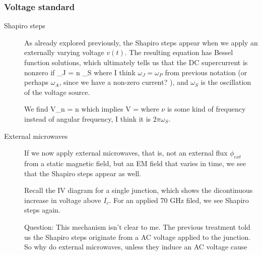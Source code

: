 \subsubsection{Voltage standard}
\begin{description}
\item[Shapiro steps] As already explored previously, the Shapiro steps appear when we apply an externally varying voltage $v(t)$. The resulting equation has Bessel function solutions, which ultimately tells us that the DC supercurrent is nonzero if
\beq
\omega_J = n \omega_S
\eeq
where I think $\omega_J = \omega_P$ from previous notation (or perhaps $\omega_A$, since we have a non-zero current? ), and $\omega_S$ is the oscillation of the voltage source. 

We find
\beq
V_n = n \nu
\eeq
which implies
\beq
\Delta V =  \nu
\eeq
where $\nu$ is some kind of frequency instead of angular frequency, I think it is $2\pi \omega_S$. 

\item[External microwaves] If we now apply external microwaves, that is, not an external flux $\phi_{ext}$ from a static magnetic field, but an EM field that varies in time, we see that the Shapiro steps appear as well. 

Recall the IV diagram for a single junction, which shows the dicontinuous increase in voltage above $I_c$. For an applied 70 GHz filed, we see Shapiro steps again. 

Question: This mechanism isn't clear to me. The previous treatment told us the Shapiro steps originate from a AC voltage applied to the junction.  So why do external microwaves, unless they induce an AC voltage cause 
\end{description}

